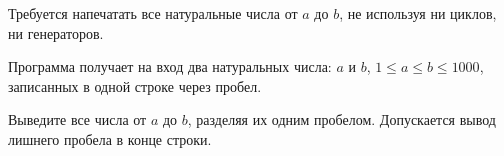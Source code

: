 Требуется напечатать все натуральные числа от $a$ до $b$, не используя ни циклов, ни генераторов.

\InputFile
Программа получает на вход два натуральных числа: $a$ и $b$, $1\le a \le b \le 1000$,
записанных в одной строке через пробел.

\OutputFile
Выведите все числа от $a$ до $b$, разделяя их одним пробелом. Допускается вывод лишнего пробела
в конце строки.
